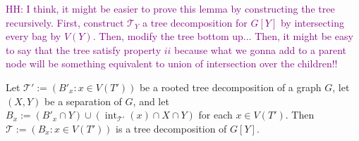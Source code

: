 \documentclass{patmorin}
\DeclareMathOperator{\interior}{int}
\newcommand{\hussein}[1]{\textcolor{purple}{HH: #1}}
\begin{document}
\hussein{I think, it might be easier to prove this lemma by constructing the tree recursively. First, construct $\mathcal{T}_Y$ a tree decomposition for $G[Y]$ by intersecting every bag by $V(Y)$. Then, modify the tree bottom up... Then, it might be easy to say that the tree satisfy property $ii$ because what we gonna add to a parent node will be something equivalent to union of intersection over the children!! }

\begin{lem}\label{restricted_decomp}
    Let $\mathcal{T}':=(B'_x:x\in V(T'))$ be a rooted tree decomposition of a graph $G$, let $(X,Y)$ be a separation of $G$, and let $B_x:=(B'_x\cap Y)\cup (\interior_{\mathcal{T}'}(x) \cap X \cap Y)$ for each $x\in V(T')$.  Then $\mathcal{T}:=(B_x:x\in V(T'))$ is a tree decomposition of $G[Y]$.
\end{lem}
\end{document}
